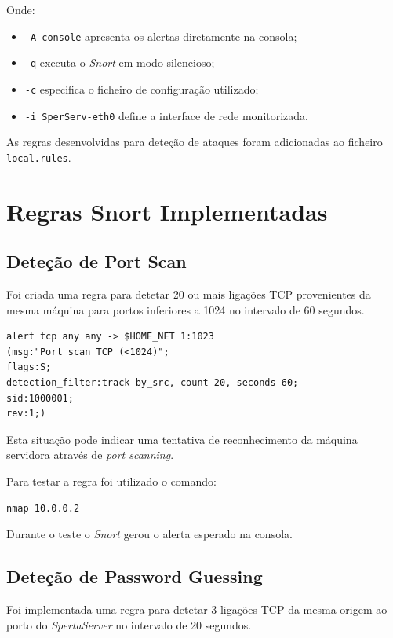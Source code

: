 \documentclass{article}
\begin{document}
Onde:
\begin{itemize}
    \item \texttt{-A console} apresenta os alertas diretamente na consola;
    \item \texttt{-q} executa o \textit{Snort} em modo silencioso;
    \item \texttt{-c} especifica o ficheiro de configuração utilizado;
    \item \texttt{-i SperServ-eth0} define a interface de rede monitorizada.
\end{itemize}

As regras desenvolvidas para deteção de ataques foram adicionadas ao ficheiro \texttt{local.rules}.

\section{Regras Snort Implementadas}

\subsection{Deteção de Port Scan}

Foi criada uma regra para detetar 20 ou mais ligações TCP provenientes da mesma máquina para portos inferiores a 1024 no intervalo de 60 segundos.

\begin{lstlisting}
alert tcp any any -> $HOME_NET 1:1023
(msg:"Port scan TCP (<1024)";
flags:S;
detection_filter:track by_src, count 20, seconds 60;
sid:1000001;
rev:1;)
\end{lstlisting}

Esta situação pode indicar uma tentativa de reconhecimento da máquina servidora através de \textit{port scanning}.

Para testar a regra foi utilizado o comando:

\begin{lstlisting}
nmap 10.0.0.2
\end{lstlisting}

Durante o teste o \textit{Snort} gerou o alerta esperado na consola.

\subsection{Deteção de Password Guessing}

Foi implementada uma regra para detetar 3 ligações TCP da mesma origem ao porto do \textit{SpertaServer} no intervalo de 20 segundos.
\end{document}
